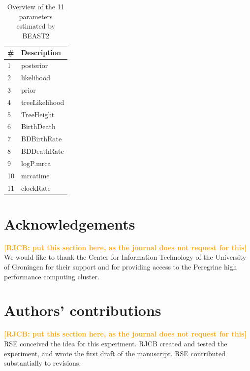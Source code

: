 \documentclass{article}
\newcommand*\richel[1]{\textcolor{orange}{\textbf{[RJCB: #1]}}}
\begin{document}
\begin{table}
  \centering 
  \begin{tabular}{l l}
    \hline
    \# & Description \\
    \hline
    \hline
    1 & posterior \\
    2 & likelihood \\
    3 & prior \\
    4 & treeLikelihood \\
    5 & TreeHeight \\
    6 & BirthDeath \\
    7 & BDBirthRate \\
    8 & BDDeathRate \\
    9 & logP.mrca \\
    10 & mrcatime \\
    11 & clockRate \\
    \hline
  \end{tabular}
  \caption{
    Overview of the 11 parameters estimated by BEAST2
  }
  \label{table:estimated_parameters}
\end{table}

\section{Acknowledgements}

\richel{put this section here, as the journal does not request for this}
We would like to thank the Center for Information Technology of the University of Groningen for their support
and for providing access to the Peregrine high performance computing cluster.

\section{Authors' contributions}

\richel{put this section here, as the journal does not request for this}
RSE conceived the idea for this experiment. 
RJCB created and tested the experiment, and wrote the first draft of the manuscript. 
RSE contributed substantially to revisions.
\end{document}
